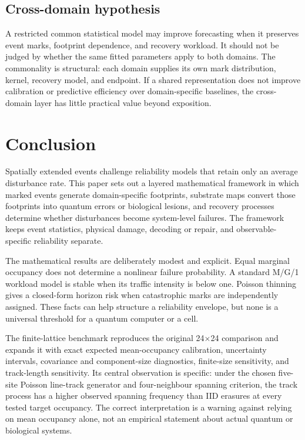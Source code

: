 \documentclass[11pt,a4paper,oneside]{article}
\begin{document}
\subsection{Cross-domain hypothesis}
A restricted common statistical model may improve forecasting when it preserves event marks, footprint dependence, and recovery workload. It should not be judged by whether the same fitted parameters apply to both domains. The commonality is structural: each domain supplies its own mark distribution, kernel, recovery model, and endpoint. If a shared representation does not improve calibration or predictive efficiency over domain-specific baselines, the cross-domain layer has little practical value beyond exposition.

\section{Conclusion}
\label{sec:conclusion}
Spatially extended events challenge reliability models that retain only an average disturbance rate. This paper sets out a layered mathematical framework in which marked events generate domain-specific footprints, substrate maps convert those footprints into quantum errors or biological lesions, and recovery processes determine whether disturbances become system-level failures. The framework keeps event statistics, physical damage, decoding or repair, and observable-specific reliability separate.

The mathematical results are deliberately modest and explicit. Equal marginal occupancy does not determine a nonlinear failure probability. A standard M/G/1 workload model is stable when its traffic intensity is below one. Poisson thinning gives a closed-form horizon risk when catastrophic marks are independently assigned. These facts can help structure a reliability envelope, but none is a universal threshold for a quantum computer or a cell.

The finite-lattice benchmark reproduces the original 24\(\times\)24 comparison and expands it with exact expected mean-occupancy calibration, uncertainty intervals, covariance and component-size diagnostics, finite-size sensitivity, and track-length sensitivity. Its central observation is specific: under the chosen five-site Poisson line-track generator and four-neighbour spanning criterion, the track process has a higher observed spanning frequency than IID erasures at every tested target occupancy. The correct interpretation is a warning against relying on mean occupancy alone, not an empirical statement about actual quantum or biological systems.
\end{document}
